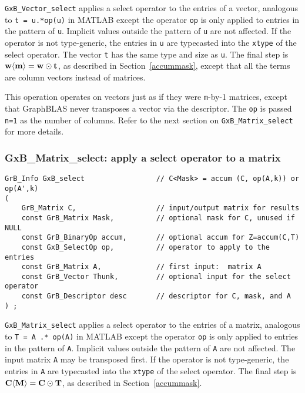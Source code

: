 \documentclass[12pt]{article}
\begin{document}
\verb'GxB_Vector_select' applies a select operator to the entries of a vector,
analogous to \verb't = u.*op(u)'  in MATLAB except the operator \verb'op' is
only applied to entries in the pattern of \verb'u'.  Implicit values outside
the pattern of \verb'u' are not affected.  If the operator is not type-generic,
the entries in \verb'u' are typecasted into the \verb'xtype' of the select
operator.  The vector \verb't' has the same type and size as \verb'u'.  The
final step is ${\bf w \langle m \rangle  = w \odot t}$, as described in
Section~\ref{accummask}, except that all the terms are column vectors instead
of matrices.

This operation operates on vectors just as if they were \verb'm'-by-1 matrices,
except that GraphBLAS never transposes a vector via the descriptor.  The
\verb'op' is passed \verb'n=1' as the number of columns.  Refer to the next
section on \verb'GxB_Matrix_select' for more details.

\newpage
\subsubsection{{\sf GxB\_Matrix\_select:} apply a select operator to a matrix}
\label{select_matrix}

\begin{mdframed}[userdefinedwidth=6in]
{\footnotesize
\begin{verbatim}
GrB_Info GxB_select                 // C<Mask> = accum (C, op(A,k)) or op(A',k)
(
    GrB_Matrix C,                   // input/output matrix for results
    const GrB_Matrix Mask,          // optional mask for C, unused if NULL
    const GrB_BinaryOp accum,       // optional accum for Z=accum(C,T)
    const GxB_SelectOp op,          // operator to apply to the entries
    const GrB_Matrix A,             // first input:  matrix A
    const GrB_Vector Thunk,         // optional input for the select operator
    const GrB_Descriptor desc       // descriptor for C, mask, and A
) ;
\end{verbatim} } \end{mdframed}

\verb'GxB_Matrix_select' applies a select operator to the entries of a matrix,
analogous to \verb'T = A .* op(A)'  in MATLAB except the operator \verb'op' is
only applied to entries in the pattern of \verb'A'.  Implicit values outside
the pattern of \verb'A' are not affected.  The input matrix \verb'A' may be
transposed first.  If the operator is not type-generic, the entries in \verb'A'
are typecasted into the \verb'xtype' of the select operator.  The final step is
${\bf C \langle M \rangle  = C \odot T}$, as described in
Section~\ref{accummask}.
\end{document}
